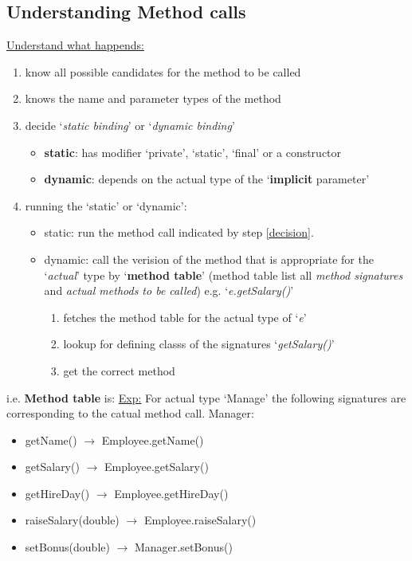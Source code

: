 \documentclass[12pt]{article}
\begin{document}
\subsection{Understanding Method calls}
\underline{Understand what happends:}
\begin{enumerate}
    \item know all possible candidates for the method to be called
    \item knows the name and parameter types of the method
    \item \label{decision} decide `\emph{static binding}' or `\emph{dynamic binding}'
    \begin{itemize}
        \item \textbf{static}: has modifier `private', `static', `final' or a constructor
        \item \textbf{dynamic}: depends on the actual type of the `\textbf{implicit} parameter' 
    \end{itemize}
    \item running the `static' or `dynamic':
    \begin{itemize}
        \item static: run the method call indicated by step \ref{decision}.
        \item dynamic: call the verision of the method that is appropriate for the `\textit{actual}' type by `\textbf{method table}'
        (method table list all \textit{method signatures} and \textit{actual methods to be called})\newline
        e.g. `\emph{e.getSalary()}'
        \begin{enumerate}
            \item fetches the method table for the actual type of `\textit{e}'
            \item lookup for defining classs of the signatures `\textit{getSalary()}'
            \item get the correct method
        \end{enumerate}
    \end{itemize}
\end{enumerate}
i.e. \textbf{Method table} is: \newline
\underline{Exp:} For actual type `Manage' the following signatures are corresponding to the catual method call.\newline
Manager:
\begin{itemize}
    \item getName() $\rightarrow$ Employee.getName()
    \item getSalary() $\rightarrow$ Employee.getSalary()
    \item getHireDay() $\rightarrow$ Employee.getHireDay()
    \item raiseSalary(double) $\rightarrow$ Employee.raiseSalary()
    \item setBonus(double) $\rightarrow$ Manager.setBonus()
\end{itemize}
\end{document}
